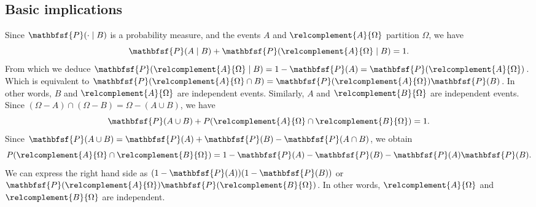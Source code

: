 \subsection*{Basic implications}

Since $\mathbfsf{P} (\cdot \mid  B)$ is a probability measure, and the events $A$ and $\relcomplement{A}{\Omega }$ partition $\Omega $, we have
    \[
\mathbfsf{P} (A \mid  B) + \mathbfsf{P} (\relcomplement{A}{\Omega } \mid  B) = 1.
    \]
From which we deduce $\mathbfsf{P} (\relcomplement{A}{\Omega } \mid B) = 1 - \mathbfsf{P} (A) = \mathbfsf{P} (\relcomplement{A}{\Omega })$.
Which is equivalent to $\mathbfsf{P} (\relcomplement{A}{\Omega } \cap  B) = \mathbfsf{P} (\relcomplement{A}{\Omega })\mathbfsf{P} (B)$.
In other words, $B$ and $\relcomplement{A}{\Omega }$ are independent events.
Similarly, $A$ and $\relcomplement{B}{\Omega }$ are independent events.
Since $(\Omega  - A) \cap  (\Omega  - B) = \Omega  - (A \cup B)$, we have
    \[
\mathbfsf{P} (A \cup B) + P(\relcomplement{A}{\Omega } \cap \relcomplement{B}{\Omega }) = 1.
    \]
Since $\mathbfsf{P} (A \cup B) = \mathbfsf{P} (A) + \mathbfsf{P} (B) - \mathbfsf{P} (A \cap  B)$, we obtain
    \[
P(\relcomplement{A}{\Omega } \cap  \relcomplement{B}{\Omega }) = 1 - \mathbfsf{P} (A) - \mathbfsf{P} (B) - \mathbfsf{P} (A)\mathbfsf{P} (B).
    \]
We can express the right hand side as $(1 - \mathbfsf{P} (A))(1 - \mathbfsf{P} (B))$ or $\mathbfsf{P} (\relcomplement{A}{\Omega })\mathbfsf{P} (\relcomplement{B}{\Omega })$.
In other words, $\relcomplement{A}{\Omega }$ and $\relcomplement{B}{\Omega }$ are independent.

